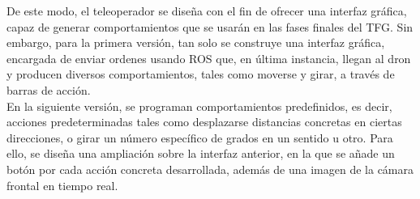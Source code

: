 De este modo, el teleoperador se diseña con el fin de ofrecer una interfaz gráfica, capaz de generar comportamientos que se usarán en las fases finales del \ac{TFG}. Sin embargo, para la primera versión, tan solo se construye una interfaz gráfica, encargada de enviar ordenes usando \ac{ROS} que, en última instancia, llegan al dron y producen diversos comportamientos, tales como moverse y girar, a través de barras de acción.\\

En la siguiente versión, se programan comportamientos predefinidos, es decir, acciones predeterminadas tales como desplazarse distancias concretas en ciertas direcciones, o girar un número específico de grados en un sentido u otro. Para ello, se diseña una ampliación sobre la interfaz anterior, en la que se añade un botón por cada acción concreta desarrollada, además de una imagen de la cámara frontal en tiempo real.\\

